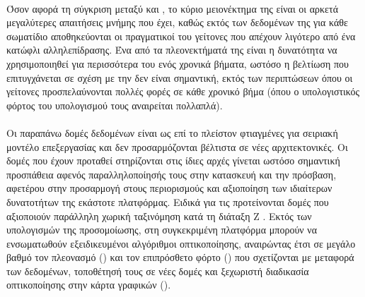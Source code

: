 \paragraph{} Όσον αφορά τη σύγκριση μεταξύ  και , το κύριο μειονέκτημα
της  είναι οι αρκετά μεγαλύτερες απαιτήσεις μνήμης που έχει, καθώς εκτός των
δεδομένων της  για κάθε σωματίδιο αποθηκεύονται οι πραγματικοί του γείτονες που
απέχουν λιγότερο από ένα κατώφλι αλληλεπίδρασης. Ένα από τα πλεονεκτήματά της είναι η
δυνατότητα να χρησιμοποιηθεί για περισσότερα του ενός χρονικά βήματα, ωστόσο η βελτίωση
που επιτυγχάνεται σε σχέση με την  δεν είναι σημαντική, εκτός των περιπτώσεων
όπου οι γείτονες προσπελαύνονται πολλές φορές σε κάθε χρονικό βήμα (όπου ο υπολογιστικός
φόρτος του υπολογισμού τους αναιρείται πολλαπλά).

\paragraph{} Οι παραπάνω δομές δεδομένων είναι ως επί το πλείστον φτιαγμένες για σειριακή
μοντέλο επεξεργασίας και δεν προσαρμόζονται βέλτιστα σε νέες  αρχιτεκτονικές. Οι
δομές που έχουν προταθεί στηρίζονται στις ίδιες αρχές γίνεται ωστόσο σημαντική προσπάθεια
αφενός παραλληλοποίησής τους στην κατασκευή και την πρόσβαση, αφετέρου στην προσαρμογή
στους περιορισμούς και αξιοποίηση των ιδιαίτερων δυνατοτήτων της εκάστοτε
πλατφόρμας. Ειδικά για τις  προτείνονται δομές που αξιοποιούν παράλληλη χωρική
ταξινόμηση κατά τη διάταξη Ζ \cite{goswami2010interactive}. Εκτός των υπολογισμών της
προσομοίωσης, στη συγκεκριμένη πλατφόρμα μπορούν να ενσωματωθούν εξειδικευμένοι αλγόριθμοι
οπτικοποίησης, αναιρώντας έτσι σε μεγάλο βαθμό τον πλεονασμό () και τον
επιπρόσθετο φόρτο () που σχετίζονται με μεταφορά των δεδομένων, τοποθέτησή
τους σε νέες δομές και ξεχωριστή διαδικασία οπτικοποίησης στην κάρτα γραφικών
().


